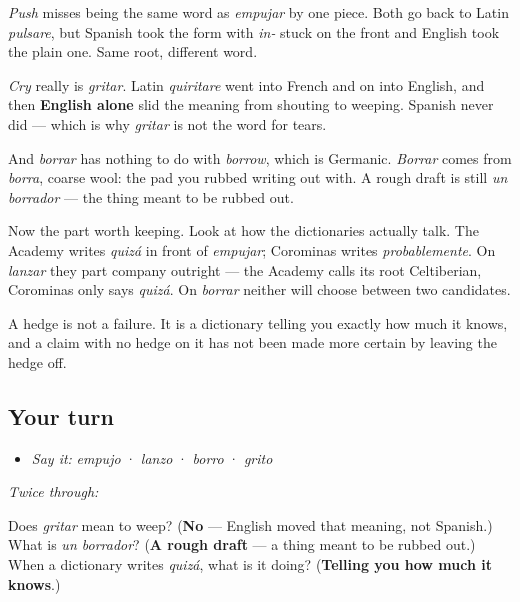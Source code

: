 \begin{culture}
\emph{Push} misses being the same word as \emph{empujar} by one piece. Both go back to Latin \emph{pulsare}, but Spanish took the form with \emph{in-} stuck on the front and English took the plain one. Same root, different word.

\emph{Cry} really is \emph{gritar}. Latin \emph{quiritare} went into French and on into English, and then \textbf{English alone} slid the meaning from shouting to weeping. Spanish never did — which is why \emph{gritar} is not the word for tears.

And \emph{borrar} has nothing to do with \emph{borrow}, which is Germanic. \emph{Borrar} comes from \emph{borra}, coarse wool: the pad you rubbed writing out with. A rough draft is still \emph{un borrador} — the thing meant to be rubbed out.

Now the part worth keeping. Look at how the dictionaries actually talk. The Academy writes \emph{quizá} in front of \emph{empujar}; Corominas writes \emph{probablemente}. On \emph{lanzar} they part company outright — the Academy calls its root Celtiberian, Corominas only says \emph{quizá}. On \emph{borrar} neither will choose between two candidates.

A hedge is not a failure. It is a dictionary telling you exactly how much it knows, and a claim with no hedge on it has not been made more certain by leaving the hedge off.
\end{culture}

\subsection*{Your turn}
\begin{itemize}
\raggedright
  \item \emph{Say it:} \emph{empujo} · \emph{lanzo} · \emph{borro} · \emph{grito}
\end{itemize}

\emph{Twice through:}

\begin{tcolorbox}[breakable,colback=teal!4,colframe=teal!35!black,title={Before you move on}]
Does \emph{gritar} mean to weep? (\textbf{No} — English moved that meaning, not Spanish.) What is \emph{un borrador}? (\textbf{A rough draft} — a thing meant to be rubbed out.) When a dictionary writes \emph{quizá}, what is it doing? (\textbf{Telling you how much it knows}.)
\end{tcolorbox}
